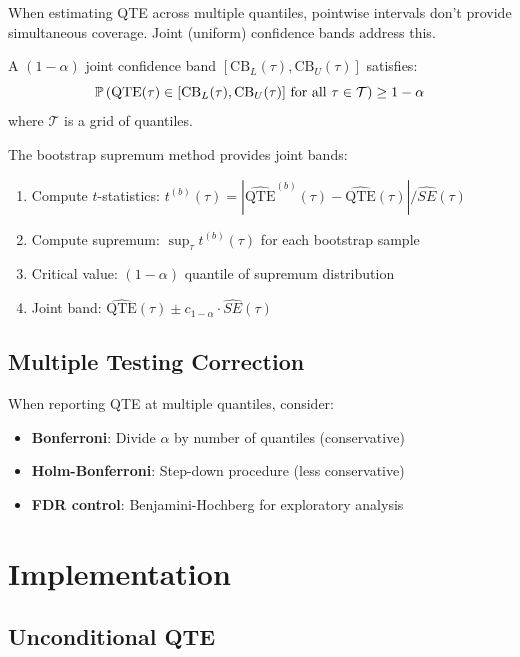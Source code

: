 When estimating QTE across multiple quantiles, pointwise intervals don't provide simultaneous coverage. Joint (uniform) confidence bands address this.

\begin{definition}
A $(1-\alpha)$ joint confidence band $[\text{CB}_L(\tau), \text{CB}_U(\tau)]$ satisfies:
\[
\mathbb{P}\left(\text{QTE}(\tau) \in [\text{CB}_L(\tau), \text{CB}_U(\tau)] \text{ for all } \tau \in \mathcal{T}\right) \geq 1 - \alpha
\]
where $\mathcal{T}$ is a grid of quantiles.
\end{definition}

The bootstrap supremum method provides joint bands:
\begin{enumerate}
    \item Compute $t$-statistics: $t^{(b)}(\tau) = |\widehat{\text{QTE}}^{(b)}(\tau) - \widehat{\text{QTE}}(\tau)| / \widehat{SE}(\tau)$
    \item Compute supremum: $\sup_\tau t^{(b)}(\tau)$ for each bootstrap sample
    \item Critical value: $(1-\alpha)$ quantile of supremum distribution
    \item Joint band: $\widehat{\text{QTE}}(\tau) \pm c_{1-\alpha} \cdot \widehat{SE}(\tau)$
\end{enumerate}

\subsection{Multiple Testing Correction}

When reporting QTE at multiple quantiles, consider:
\begin{itemize}
    \item \textbf{Bonferroni}: Divide $\alpha$ by number of quantiles (conservative)
    \item \textbf{Holm-Bonferroni}: Step-down procedure (less conservative)
    \item \textbf{FDR control}: Benjamini-Hochberg for exploratory analysis
\end{itemize}

\section{Implementation}
\label{sec:qte-implementation}

\subsection{Unconditional QTE}

